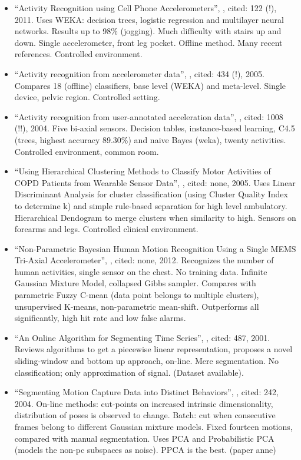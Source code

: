 \begin{itemize}
  \item ``Activity Recognition using Cell Phone Accelerometers'', \cite{kwapisz2011activity}, cited: 122 (!), 2011. Uses WEKA: decision trees, logistic regression and multilayer neural networks. Results up to 98\% (jogging). Much difficulty with stairs up and down. Single accelerometer, front leg pocket. Offline method. Many recent references. Controlled environment.
  \item ``Activity recognition from accelerometer data'', \cite{ravi2005activity}, cited: 434 (!), 2005. Compares 18 (offline) classifiers, base level (WEKA) and meta-level. Single device, pelvic region. Controlled setting.
  \item ``Activity recognition from user-annotated acceleration data'', \cite{bao2004activity}, cited: 1008 (!!), 2004. Five bi-axial sensors. Decision tables, instance-based learning, C4.5 (trees, highest accuracy 89.30\%) and naive Bayes (weka), twenty activities. Controlled environment, common room.
  \item ``Using Hierarchical Clustering Methods to Classify Motor Activities of COPD Patients from Wearable Sensor Data'', \cite{sherril2005using}, cited: none, 2005. Uses Linear Discriminant Analysis for cluster classification (using Cluster Quality Index to determine k) and simple rule-based separation for high level ambulatory. Hierarchical Dendogram to merge clusters when similarity to high. Sensors on forearms and legs. Controlled clinical environment.
  \item ``Non-Parametric Bayesian Human Motion Recognition Using a Single MEMS Tri-Axial Accelerometer'', \cite{ahmed2012non}, cited: none, 2012. Recognizes the number of human activities, single sensor on the chest. No training data. Infinite Gaussian Mixture Model, collapsed Gibbs sampler. Compares with parametric Fuzzy C-mean (data point belongs to multiple clusters), unsupervised K-means, non-parametric mean-shift. Outperforms all significantly, high hit rate and low false alarms.
  \item ``An Online Algorithm for Segmenting Time Series'', \cite{keogh2001online}, cited: 487, 2001. Reviews algorithms to get a piecewise linear representation, proposes a novel sliding-window and bottom up approach, on-line. Mere segmentation. No classification; only approximation of signal. (Dataset available).
  \item ``Segmenting Motion Capture Data into Distinct Behaviors'', \cite{barbivc2004segmenting}, cited: 242, 2004. On-line methods: cut-points on increased intrinsic dimensionality, distribution of poses is observed to change. Batch: cut when consecutive frames belong to different Gaussian mixture models. Fixed fourteen motions, compared with manual segmentation. Uses PCA and Probabilistic PCA (models the non-pc subspaces as noise). PPCA is the best. (paper anne)

\end{itemize}

